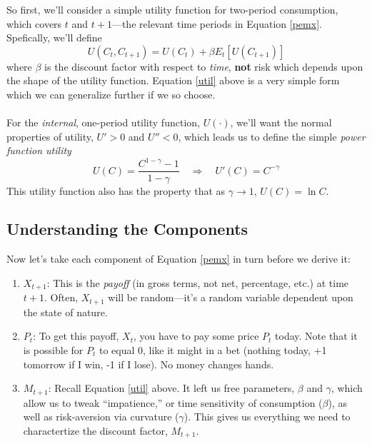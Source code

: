\documentclass[a4paper,12pt]{scrartcl}
\begin{document}
So first, we'll consider a simple utility function for two-period
consumption, which covers $t$ and $t+1$---the relevant time periods
in Equation \ref{pemx}. Spefically, we'll define
\begin{equation}
    \label{util}
    U(C_t, C_{t+1}) = U(C_t) + \beta E_t\left[U(C_{t+1})\right]
\end{equation}
where $\beta$ is the discount factor with respect to \emph{time},
\textbf{not} risk which depends upon the shape of the utility function.
Equation \ref{util} above is a very simple form which we can generalize
further if we so choose.
\\
\\
For the \emph{internal}, one-period utility function, $U(\cdot)$, we'll want
the normal properties of utility, $U'>0$ and $U''<0$, which leads
us to define the simple \emph{power function utility}
\begin{equation}
    \label{upwr}
    U(C) = \frac{C^{1-\gamma}-1}{1-\gamma} \quad\Rightarrow\quad
	U'(C) = C^{-\gamma}
\end{equation}
This utility function also has the property that as $\gamma\rightarrow 1$,
$U(C) = \ln C$.

\subsection{Understanding the Components}

Now let's take each component of Equation \ref{pemx} in turn
before we derive it:
\begin{enumerate}
    \item $X_{t+1}$: This is the \emph{payoff} (in gross
	terms, not net, percentage, etc.) at time $t+1$.  Often, 
	$X_{t+1}$ 
	will be random---it's a random variable dependent upon
	the state of nature.
    \item $P_t$: To get this payoff, $X_t$, you have to pay some 
	price $P_t$ today. Note that
	it is possible for $P_t$ to equal 0, like it might in a 
	bet (nothing today, +1 tomorrow if I win, -1 if I lose). 
	No money changes hands.
    \item $M_{t+1}$: Recall Equation \ref{util} above.  It left
	us free parameters, $\beta$ and $\gamma$, which allow us
	to tweak ``impatience,'' or time sensitivity of 
	consumption ($\beta$), as well as risk-aversion via 
	curvature ($\gamma$).
	This gives us everything we need to charactertize the 
	discount factor, $M_{t+1}$.
\end{enumerate}
\end{document}
